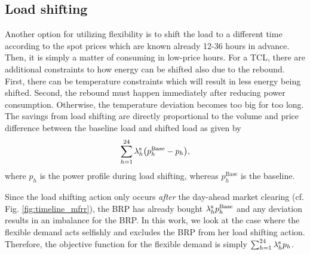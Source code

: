 \vspace{-2mm}
\subsection{Load shifting}
%
Another option for utilizing flexibility is to shift the load to a different time according to the spot prices which are known already 12-36 hours in advance. Then, it is simply a matter of consuming in low-price hours.
%
For a TCL, there are additional constraints to how energy can be shifted also due to the rebound. First, there can be temperature constraints which will result in less energy being shifted. Second, the rebound must happen immediately after reducing power consumption. Otherwise, the temperature deviation becomes too big for too long.
The savings from load shifting are directly proportional to the volume and price difference between the baseline load and shifted load as given by
%
\begin{equation}\label{eq:load_shifting_savings}
    \sum_{h=1}^{24} \lambda^{\rm{s}}_{h} \big(p^{\text{Base}}_{h} -  p_{h}\big),
\end{equation}
%
where $p_{h}$ is the power profile during load shifting, whereas $p^{\text{Base}}_{h}$ is the baseline. 

Since the load shifting action only occurs \textit{after} the day-ahead market clearing (cf. Fig. \ref{fig:timeline_mfrr}), the BRP has already bought $\lambda^{\rm{s}}_{h} p^{\text{Base}}_{h}$ and any deviation results in an imbalance for the BRP. In this work, we look at the case where the flexible demand acts selfishly and excludes the BRP from her load shifting action. Therefore, the objective function for the flexible demand is simply $\sum_{h=1}^{24} \lambda_{h}^{\rm{s}} p_{h}$.

